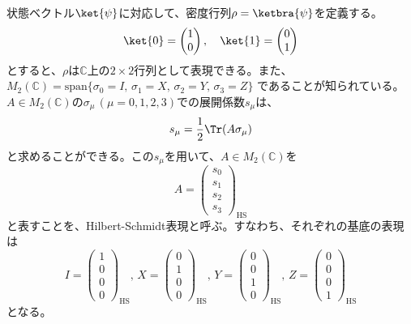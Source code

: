 \documentclass[a4paper,11pt,uplatex]{jsarticle}%
\begin{document}
状態ベクトル$\ket{\psi}$に対応して、密度行列$\rho=\ketbra{\psi}$を定義する。
\begin{equation}
  \ket{0}=
  \begin{pmatrix}
   1 \\ 0 
  \end{pmatrix},\quad
  \ket{1} = 
  \begin{pmatrix}
    0 \\ 1
  \end{pmatrix}
\end{equation}
とすると、$\rho$は$\mathbb{C}$上の$2\times 2$行列として表現できる。また、
$M_2(\mathbb{C}) = \text{span}\{\sigma_0=I,\,\sigma_1=X,\,\sigma_2=Y,\,\sigma_3=Z\}$
であることが知られている。$A\in M_2(\mathbb{C})$の$\sigma_\mu\,(\mu=0,1,2,3)$での展開係数$s_{\mu}$は、
\begin{equation}
  s_\mu = \frac{1}{2}\Tr(A\sigma_{\mu})
\end{equation}
と求めることができる。この$s_\mu$を用いて、$A\in M_2(\mathbb{C})$を
\begin{equation}
  A=
  \begin{pmatrix}
    s_0 \\ s_1 \\ s_2 \\ s_3
  \end{pmatrix}_{\text{HS}}
\end{equation}
と表すことを、Hilbert-Schmidt表現と呼ぶ。すなわち、それぞれの基底の表現は
\begin{equation}
  I=
  \begin{pmatrix}
    1 \\ 0 \\ 0 \\ 0
  \end{pmatrix}_{\text{HS}},\,
  X=
  \begin{pmatrix}
    0 \\ 1 \\ 0 \\ 0
  \end{pmatrix}_{\text{HS}},\,
  Y=
  \begin{pmatrix}
    0 \\ 0 \\ 1 \\ 0
  \end{pmatrix}_{\text{HS}},\,
  Z=
  \begin{pmatrix}
    0 \\ 0 \\ 0 \\ 1
  \end{pmatrix}_{\text{HS}}
\end{equation}
となる。
\end{document}
